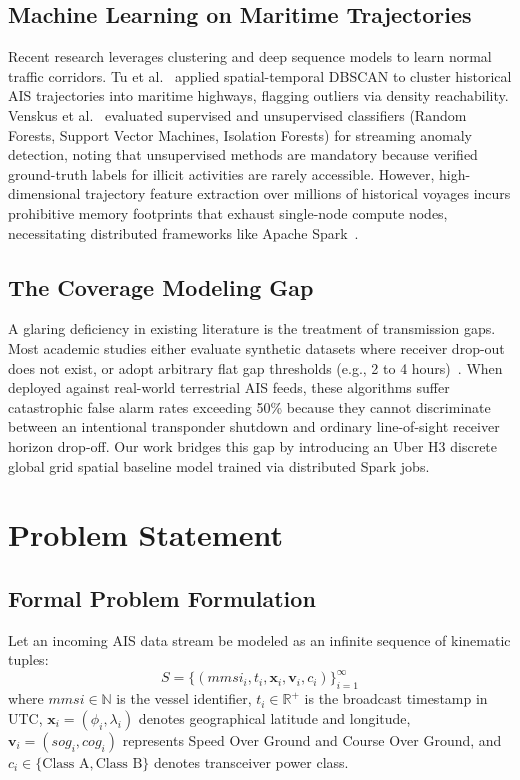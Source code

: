 \documentclass[10pt,twocolumn,a4paper]{article}
\begin{document}
\subsection{Machine Learning on Maritime Trajectories}
Recent research leverages clustering and deep sequence models to learn normal traffic corridors. Tu et al.~\cite{tu2018spatial} applied spatial-temporal DBSCAN to cluster historical AIS trajectories into maritime highways, flagging outliers via density reachability. Venskus et al.~\cite{venskus2021maritime} evaluated supervised and unsupervised classifiers (Random Forests, Support Vector Machines, Isolation Forests) for streaming anomaly detection, noting that unsupervised methods are mandatory because verified ground-truth labels for illicit activities are rarely accessible. However, high-dimensional trajectory feature extraction over millions of historical voyages incurs prohibitive memory footprints that exhaust single-node compute nodes, necessitating distributed frameworks like Apache Spark~\cite{zaharia2016apache,meng2016mllib}.

\subsection{The Coverage Modeling Gap}
A glaring deficiency in existing literature is the treatment of transmission gaps. Most academic studies either evaluate synthetic datasets where receiver drop-out does not exist, or adopt arbitrary flat gap thresholds (e.g., 2 to 4 hours)~\cite{park2020illuminating}. When deployed against real-world terrestrial AIS feeds, these algorithms suffer catastrophic false alarm rates exceeding 50\% because they cannot discriminate between an intentional transponder shutdown and ordinary line-of-sight receiver horizon drop-off. Our work bridges this gap by introducing an Uber H3 discrete global grid spatial baseline model trained via distributed Spark jobs.

\section{Problem Statement}
\label{sec:problem}

\subsection{Formal Problem Formulation}
Let an incoming AIS data stream be modeled as an infinite sequence of kinematic tuples:
\begin{equation}
    S = \{(mmsi_i, t_i, \mathbf{x}_i, \mathbf{v}_i, c_i)\}_{i=1}^{\infty}
\end{equation}
where $mmsi \in \mathbb{N}$ is the vessel identifier, $t_i \in \mathbb{R}^+$ is the broadcast timestamp in UTC, $\mathbf{x}_i = (\phi_i, \lambda_i)$ denotes geographical latitude and longitude, $\mathbf{v}_i = (sog_i, cog_i)$ represents Speed Over Ground and Course Over Ground, and $c_i \in \{\text{Class A}, \text{Class B}\}$ denotes transceiver power class.
\end{document}
